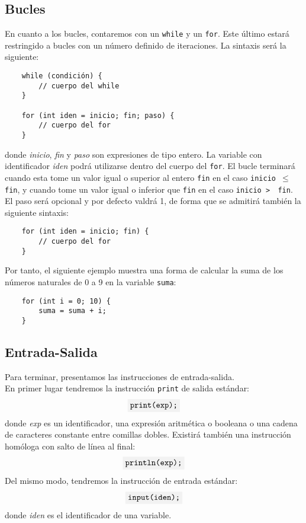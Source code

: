 \documentclass[10pt a4paper]{article}
\newcommand{\code}[1]{\colorbox{light-gray}{\texttt{#1}}}
\numberwithin{equation}{section}
\begin{document}
\subsection{Bucles}
En cuanto a los bucles, contaremos con un \code{while} y un \code{for}. Este último estará restringido a bucles con un número definido de iteraciones. La sintaxis será la siguiente:
\begin{verbatim}
    while (condición) {
        // cuerpo del while
    }
    
    for (int iden = inicio; fin; paso) {
        // cuerpo del for
    }
\end{verbatim}
donde \textit{inicio}, \textit{fin} y \textit{paso} son expresiones de tipo entero. La variable con identificador \textit{iden} podrá utilizarse dentro del cuerpo del \code{for}. El bucle terminará cuando esta tome un valor igual o superior al entero \code{fin} en el caso \code{inicio $\leq$ fin}, y cuando tome un valor igual o inferior que \code{fin} en el caso \code{inicio > $\:\:$fin}. El paso será opcional y por defecto valdrá 1, de forma que se admitirá también la siguiente sintaxis:
\begin{verbatim}
    for (int iden = inicio; fin) {
        // cuerpo del for
    }
\end{verbatim}
Por tanto, el siguiente ejemplo muestra una forma de calcular la suma de los números naturales de 0 a 9 en la variable \code{suma}:
\begin{verbatim}
    for (int i = 0; 10) {
        suma = suma + i;
    }
\end{verbatim}



\subsection{Entrada-Salida}
Para terminar, presentamos las instrucciones de entrada-salida.\\
En primer lugar tendremos la instrucción \code{print} de salida estándar:
\begin{equation*}
    \code{print(exp);}
\end{equation*}
donde \textit{exp} es un identificador, una expresión aritmética o booleana o una cadena de caracteres constante entre comillas dobles. Existirá también una instrucción homóloga con salto de línea al final:
\begin{equation*}
    \code{println(exp);}
\end{equation*}
Del mismo modo, tendremos la instrucción de entrada estándar:
\begin{equation*}
    \code{input(iden);}
\end{equation*}
donde \textit{iden} es el identificador de una variable.
\end{document}
